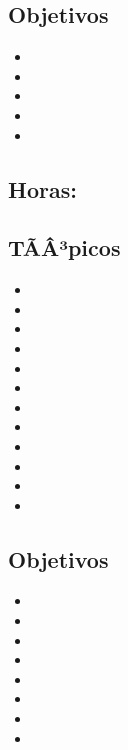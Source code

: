 \subsection*{Objetivos}
\begin{itemize}
	\item \PFDOSObjUNO
	\item \PFDOSObjDOS
	\item \PFDOSObjTRES
	\item \PFDOSObjCUATRO
	\item \PFDOSObjCINCO
\end{itemize}

\subsection{\PFTRESDef}\label{sec:BOK-PF3}
\subsection*{Horas: \PFTRESHours}

\subsection*{TÃÂ³picos}
\begin{itemize}
	\item \PFTRESTopicTipos
	\item \PFTRESTopicArreglos
	\item \PFTRESTopicRegistros
	\item \PFTRESTopicCadenas
	\item \PFTRESTopicRepresentacion
	\item \PFTRESTopicAsignacion
	\item \PFTRESTopicAdministracion
	\item \PFTRESTopicPunteros
	\item \PFTRESTopicEstructuras
	\item \PFTRESTopicEstrategias
	\item \PFTRESTopicEstrategiasde
	\item \PFTRESTopicEstrategiaspara
\end{itemize}

\subsection*{Objetivos}
\begin{itemize}
	\item \PFTRESObjUNO
	\item \PFTRESObjDOS
	\item \PFTRESObjTRES
	\item \PFTRESObjCUATRO
	\item \PFTRESObjCINCO
	\item \PFTRESObjSEIS
	\item \PFTRESObjSIETE
	\item \PFTRESObjOCHO
\end{itemize}

